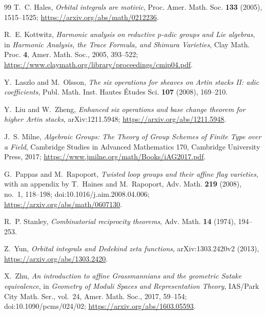 \documentclass[11pt]{article}
\theoremstyle{definition}
\theoremstyle{remark}
\begin{document}
\begin{thebibliography}{99}
T.~C. Hales,
\emph{Orbital integrals are motivic},
Proc. Amer. Math. Soc. \textbf{133} (2005), 1515--1525;
\url{https://arxiv.org/abs/math/0212236}.

R.~E. Kottwitz,
\emph{Harmonic analysis on reductive $p$-adic groups and Lie algebras},
in \emph{Harmonic Analysis, the Trace Formula, and Shimura Varieties},
Clay Math. Proc. \textbf{4}, Amer. Math. Soc., 2005, 393--522;
\url{https://www.claymath.org/library/proceedings/cmip04.pdf}.

Y.~Laszlo and M.~Olsson,
\emph{The six operations for sheaves on Artin stacks II: adic coefficients},
Publ. Math. Inst. Hautes \'Etudes Sci. \textbf{107} (2008), 169--210.

Y.~Liu and W.~Zheng,
\emph{Enhanced six operations and base change theorem for higher Artin
stacks}, arXiv:1211.5948;
\url{https://arxiv.org/abs/1211.5948}.

J.~S. Milne,
\emph{Algebraic Groups: The Theory of Group Schemes of Finite Type over a
Field},
Cambridge Studies in Advanced Mathematics 170,
Cambridge University Press, 2017;
\url{https://www.jmilne.org/math/Books/iAG2017.pdf}.

G.~Pappas and M.~Rapoport,
\emph{Twisted loop groups and their affine flag varieties},
with an appendix by T.~Haines and M.~Rapoport,
Adv. Math. \textbf{219} (2008), no.~1, 118--198;
doi:10.1016/j.aim.2008.04.006;
\url{https://arxiv.org/abs/math/0607130}.

R.~P. Stanley,
\emph{Combinatorial reciprocity theorems},
Adv. Math. \textbf{14} (1974), 194--253.

Z.~Yun,
\emph{Orbital integrals and Dedekind zeta functions},
arXiv:1303.2420v2 (2013),
\url{https://arxiv.org/abs/1303.2420}.

X.~Zhu,
\emph{An introduction to affine Grassmannians and the geometric Satake
equivalence},
in \emph{Geometry of Moduli Spaces and Representation Theory},
IAS/Park City Math. Ser., vol.~24, Amer. Math. Soc., 2017, 59--154;
doi:10.1090/pcms/024/02;
\url{https://arxiv.org/abs/1603.05593}.

\end{thebibliography}
\end{document}
